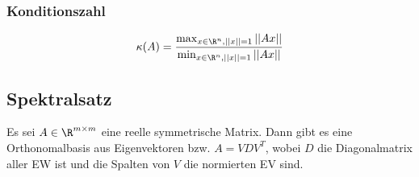 \subsubsection{Konditionszahl}
$$
	\kappa(A) = \frac{\max_{x\in\R^n, ||x||=1} ||Ax||}{\min_{x\in\R^n, ||x||=1} ||Ax||}
$$
\subsection{Spektralsatz}
Es sei $A\in\R^{m\times m}$ eine reelle symmetrische Matrix. Dann gibt es eine Orthonomalbasis aus Eigenvektoren bzw. $A=VDV^T$, wobei $D$ die Diagonalmatrix aller EW ist und die Spalten von $V$ die normierten EV sind.